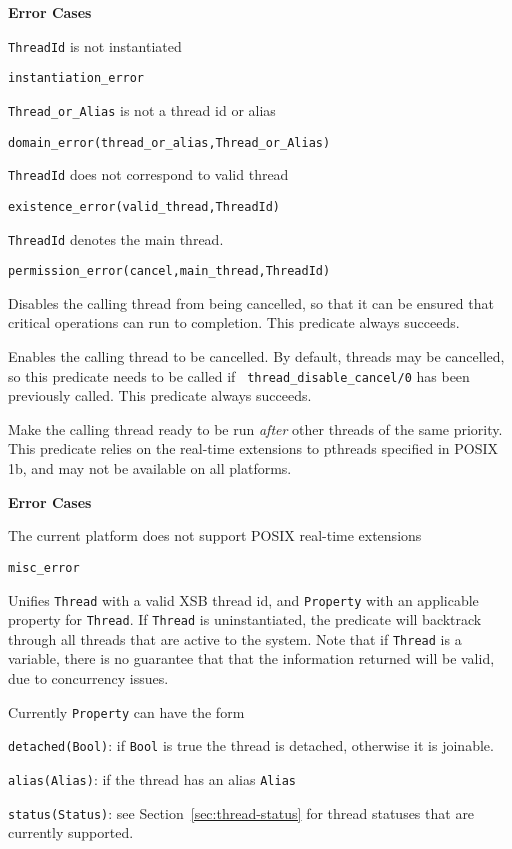 \begin{description}
{\bf Error Cases}
\bi
\item 	{\tt ThreadId} is not instantiated
\bi
\item 	{\tt instantiation\_error}
\ei
%
\item 	{\tt Thread\_or\_Alias} is not a thread id or alias
\bi
\item 	{\tt domain\_error(thread\_or\_alias,Thread\_or\_Alias)}
\ei
%
\item   {\tt ThreadId} does not correspond to valid thread
\bi
\item   {\tt existence\_error(valid\_thread,ThreadId)}
\ei
\item   {\tt ThreadId} denotes the main thread.
\bi
\item   {\tt permission\_error(cancel,main\_thread,ThreadId)}
\ei
\ei

% 
Disables the calling thread from being cancelled, so that it can be
ensured that critical operations can run to completion.  This
predicate always succeeds.

% 
Enables the calling thread to be cancelled.  By default, threads may
be cancelled, so this predicate needs to be called if {\tt
  thread\_disable\_cancel/0} has been previously called.  This
predicate always succeeds.

% 
Make the calling thread ready to be run {\em after} other threads of
the same priority.  This predicate relies on the real-time extensions
to pthreads specified in POSIX 1b, and may not be available on all
platforms.

{\bf Error Cases}
\bi
\item 	The current platform does not support POSIX real-time extensions
\bi
\item 	{\tt misc\_error}
\ei
\ei

%
Unifies {\tt Thread} with a valid XSB thread id, and {\tt Property}
with an applicable property for {\tt Thread}.  If {\tt Thread} is
uninstantiated, the predicate will backtrack through all threads that
are active to the system.  Note that if {\tt Thread} is a variable,
there is no guarantee that that the information returned will be
valid, due to concurrency issues.

Currently {\tt Property} can have the form 
\bi
\item {\tt detached(Bool)}: if {\tt Bool} is true the thread is
  detached, otherwise it is joinable.
%
\item {\tt alias(Alias)}: if the thread has an alias {\tt Alias}
%
\item {\tt status(Status)}: see Section~\ref{sec:thread-status} for
  thread statuses that are currently supported.
\ei


\end{description}

